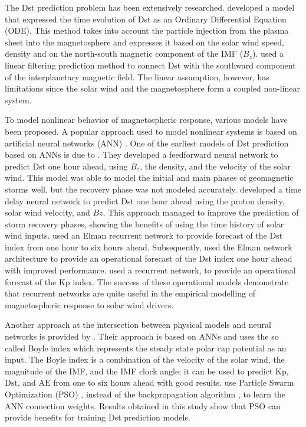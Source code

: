 The Dst prediction problem has been extensively researched. \citet{JGR:JGR10260} developed a model 
that expressed the time evolution of Dst as an Ordinary Differential Equation (ODE). This method takes into account 
the particle injection from the plasma sheet into the magnetosphere and expresses it based on the solar wind speed, 
density and on the north-south magnetic component of the IMF ($B_z$). \citet{Iyemori1979} used a linear filtering 
prediction method to connect Dst with the southward component of the interplanetary magnetic field. The linear 
assumption, however, has limitations since the solar wind and the magnetosphere form a coupled non-linear system. 

To model nonlinear behavior of magnetospheric response, various models have been proposed. A popular approach 
used to model nonlinear systems is based on artificial neural networks (ANN) \citep{haykin1994neural}. One of the 
earliest models of Dst prediction based on ANNs is due to \citet{lundstedt1994prediction}. They developed 
a feedforward neural network to predict Dst one hour ahead, using $B_z$, the density, and the velocity of 
the solar wind. This model was able to model the initial and main phases of geomagnetic storms well, but 
the recovery phase was not modeled accurately. \citet{gleisner1996predicting} developed a time delay 
neural network \citep{Waibel1989} to predict Dst one hour ahead using the proton density, solar wind 
velocity, and $Bz$. This approach managed to improve the prediction of storm recovery phases, showing 
the benefits of using the time history of solar wind inputs. \citet{wu1997geomagnetic} used an Elman 
recurrent network \citep{elman} to provide forecast of the Dst index from one hour to six hours ahead. 
Subsequently, \citet{Lund} used the Elman network architecture to provide an operational forecast of 
the Dst index one hour ahead with improved performance. \citet{JGRA:JGRA17461} used a recurrent network, 
to provide an operational forecast of the Kp index. The success of these operational models demonstrate that 
recurrent networks are quite useful in the empirical modelling of magnetospheric response to solar wind drivers. 

Another approach at the intersection between physical models and neural networks is provided by 
\citet{Bala2012}. Their approach is based on ANNs and uses the so called Boyle index which represents 
the steady state polar cap potential as an input. The Boyle index is a combination of the velocity of 
the solar wind, the magnitude of the IMF, and the IMF clock angle; it can be used to predict 
$\mathrm{Kp}$, $\mathrm{Dst}$, and $\mathrm{AE}$ from one to six hours ahead with good results. 
\citet{Lazzus} use Particle Swarm Optimization (PSO) \citep{eberhart1995new}, instead of the 
backpropagation algorithm \citep{rummelhart1986parallel}, to learn the ANN connection weights. 
Results obtained in this study show that PSO can provide benefits for training Dst prediction 
models.


